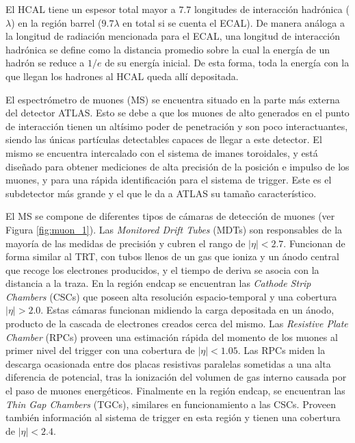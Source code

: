 El HCAL tiene un espesor total mayor a $7.7$ longitudes de interacción
hadrónica ($\lambda$) en la región barrel ($9.7\lambda$ en total si se cuenta el ECAL). De manera
análoga a la longitud de radiación mencionada para el ECAL, una longitud de
interacción hadrónica se define como la distancia promedio sobre la cual la energía
de un hadrón se reduce a $1/e$ de su energía inicial. De esta forma, toda la energía
con la que llegan los hadrones al HCAL queda allí depositada.



El espectrómetro de muones (MS) se encuentra situado en la parte más externa del detector ATLAS. Esto se debe a que los muones de alto \pt generados en el punto de interacción tienen un altísimo poder de penetración y son poco interactuantes, siendo las únicas partículas detectables capaces de llegar a este detector. El mismo se encuentra intercalado con el sistema de imanes toroidales, y está diseñado para obtener mediciones de alta precisión de la posición e impulso de los muones, y para una rápida identificación para el sistema de trigger. Este es el subdetector más grande y el que le da a ATLAS su tamaño característico. 

El MS se compone de diferentes tipos de cámaras de detección de muones (ver Figura \ref{fig:muon_1}). Las \textit{Monitored Drift Tubes} (MDTs) son responsables de la mayoría de las medidas de precisión y cubren el rango de $|\eta|<2.7$. Funcionan de forma similar al TRT, con tubos llenos de un gas que ioniza y un ánodo central que recoge los electrones producidos, y el tiempo de deriva se asocia con la distancia a la traza. En la región endcap se encuentran las \textit{Cathode Strip Chambers} (CSCs) que poseen alta resolución espacio-temporal y una cobertura $|\eta|>2.0$. Estas cámaras funcionan midiendo la carga depositada en un ánodo, producto de la cascada de electrones creados cerca del mismo. Las \textit{Resistive Plate Chamber} (RPCs) proveen una estimación rápida del momento de los muones al primer nivel del trigger con una cobertura de $|\eta|<1.05$. Las RPCs miden la descarga ocasionada entre dos placas resistivas paralelas sometidas a una alta diferencia de potencial, tras la ionización del volumen de gas interno causada por el paso de muones energéticos. Finalmente en la región endcap, se encuentran las \textit{Thin Gap Chambers} (TGCs), similares en funcionamiento a las CSCs. Proveen también información al sistema de trigger en esta región y tienen una cobertura de $|\eta|<2.4$.


